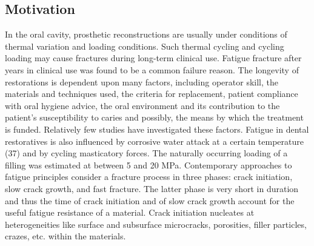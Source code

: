 \documentclass[12pt,twoside,english]{book}
\renewcommand{\~}{\perispomeni}%
\numberwithin{equation}{section}
\numberwithin{figure}{section}
\begin{document}


\subsection{Motivation}

In the oral cavity, prosthetic reconstructions are usually under conditions of thermal variation and loading conditions. Such thermal cycling and cycling loading may cause fractures during long-term clinical use\cite{Rantala:2003p2481,Lassila:2004p2512}. Fatigue fracture after years in clinical use was found to be a common failure reason. The longevity of restorations is dependent upon many factors, including operator skill, the materials and techniques used, the criteria for replacement, patient compliance with oral hygiene advice, the oral environment and its contribution to the patient\textquoteright{}s susceptibility to caries and possibly, the means by which the treatment is funded. Relatively few studies have investigated these factors\cite{Burke:2001p2517}. Fatigue in dental restoratives is also influenced by corrosive water attack at a certain temperature (37\textdegree{}) and by cycling masticatory forces. The naturally occurring loading of a filling was estimated\cite{Braem:1994p2520} at between 5 and 20 MPa. Contemporary approaches to fatigue principles consider a fracture process in three phases: crack initiation, slow crack growth, and fast fracture. The latter phase is very short in duration and thus the time of crack initiation and of slow crack growth account for the useful fatigue resistance of a material. Crack initiation nucleates at heterogeneities like surface and subsurface microcracks, porosities, filler particles, crazes, etc. within the materials. 
\end{document}
